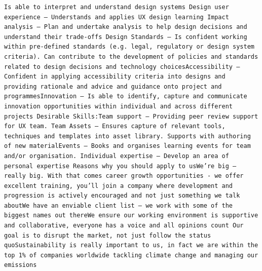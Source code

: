 \documentclass[
]{article}
\begin{document}
\begin{verbatim}
Is able to interpret and understand design systems Design user experience – Understands and applies UX design learning Impact analysis – Plan and undertake analysis to help design decisions and understand their trade-offs Design Standards – Is confident working within pre-defined standards (e.g. legal, regulatory or design system criteria). Can contribute to the development of policies and standards related to design decisions and technology choicesAccessibility – Confident in applying accessibility criteria into designs and providing rationale and advice and guidance onto project and programmesInnovation – Is able to identify, capture and communicate innovation opportunities within individual and across different projects Desirable Skills:Team support – Providing peer review support for UX team. Team Assets – Ensures capture of relevant tools, techniques and templates into asset library. Supports with authoring of new materialEvents – Books and organises learning events for team and/or organisation. Individual expertise – Develop an area of personal expertise Reasons why you should apply to usWe’re big – really big. With that comes career growth opportunities - we offer excellent training, you’ll join a company where development and progression is actively encouraged and not just something we talk aboutWe have an enviable client list – we work with some of the biggest names out thereWe ensure our working environment is supportive and collaborative, everyone has a voice and all opinions count Our goal is to disrupt the market, not just follow the status quoSustainability is really important to us, in fact we are within the top 1% of companies worldwide tackling climate change and managing our emissions

\end{verbatim}
\end{document}
